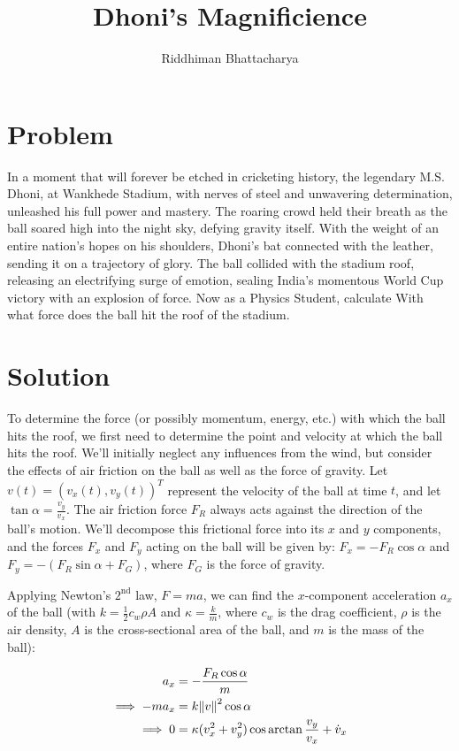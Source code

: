 \documentclass[a4paper,11pt]{article}
\title{\Huge \textbf{Dhoni's Magnificience}}
\author{\Large Riddhiman Bhattacharya}
\date{}
\numberwithin{equation}{section}
\numberwithin{figure}{section}
\begin{document}
\clearpage
\maketitle
\thispagestyle{empty}


\large

\section{Problem}
In a moment that will forever be etched in cricketing history, the legendary M.S. Dhoni, at Wankhede Stadium, with nerves of steel and unwavering determination, unleashed his full power and mastery. The roaring crowd held their breath as the ball soared high into the night sky, defying gravity itself. With the weight of an entire nation's hopes on his shoulders, Dhoni's bat connected with the leather, sending it on a trajectory of glory. The ball collided with the stadium roof, releasing an electrifying surge of emotion, sealing India's momentous World Cup victory with an explosion of force.
Now as a Physics Student, calculate With what force does the ball hit the roof of the stadium.


\section{Solution}
To determine the force (or possibly momentum, energy, etc.) with which the ball hits the roof, we first need to determine the point and velocity at which the ball hits the roof. We'll initially neglect any influences from the wind, but consider the effects of air friction on the ball as well as the force of gravity. Let $v(t) = (v_x(t), v_y(t))^T$ represent the velocity of the ball at time $t$, and let $\tan \alpha = \frac{v_y}{v_x}$. The air friction force $F_R$ always acts against the direction of the ball's motion. We'll decompose this frictional force into its $x$ and $y$ components, and the forces $F_x$ and $F_y$ acting on the ball will be given by: $F_x = -F_R \cos \alpha$ and $F_y = -(F_R \sin \alpha + F_G)$, where $F_G$ is the force of gravity.

Applying Newton's $2^\text{nd}$ law, $F = ma$, we can find the $x$-component acceleration $a_x$ of the ball (with $k = \frac{1}{2}c_w \rho A$ and $\kappa = \frac{k}{m}$, where $c_w$ is the drag coefficient, $\rho$ is the air density, $A$ is the cross-sectional area of the ball, and $m$ is the mass of the ball):

\begin{align*}
    a_x        & = -\frac{F_R \cos \alpha}{m}                                      \\
    \implies -ma_x & = k \norm{v}^2 \cos \alpha                                        \\
    \implies 0     & = \kappa (v_x^2 + v_y^2) \cos \arctan \frac{v_y}{v_x} + \dot{v}_x
\end{align*}
\end{document}
